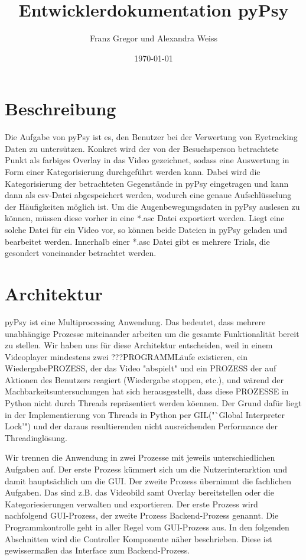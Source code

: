\documentclass[a4paper,draft]{scrartcl}
\title{Entwicklerdokumentation pyPsy}
\author{Franz Gregor und Alexandra Weiss}
\date{\today}
\begin{document}
\maketitle
\newpage
\tableofcontents
\newpage
\section{Beschreibung}
Die Aufgabe von pyPsy ist es, den Benutzer bei der Verwertung von Eyetracking Daten zu untersützen. Konkret wird der von der Besuchsperson betrachtete Punkt als farbiges Overlay in das Video gezeichnet, sodass eine Auswertung in Form einer Kategorisierung durchgeführt werden kann. Dabei wird die Kategorisierung der betrachteten Gegenstände in pyPsy eingetragen und kann dann als csv-Datei abgespeichert werden, wodurch eine genaue Aufschlüsselung der Häufigkeiten möglich ist. 
Um die Augenbewegungsdaten in pyPsy auslesen zu können, müssen diese vorher in eine *.asc Datei exportiert werden. Liegt eine solche Datei für ein Video vor, so können beide Dateien in pyPsy geladen und bearbeitet werden.
Innerhalb einer *.asc Datei gibt es mehrere Trials, die gesondert voneinander betrachtet werden.

\section{Architektur}
pyPsy ist eine Multiprocessing Anwendung.
Das bedeutet, dass mehrere unabh\"angige Prozesse miteinander arbeiten um die gesamte Funktionalit\"at bereit zu stellen.
Wir haben uns f\"ur diese Architektur entscheiden, weil in einem Videoplayer mindestens zwei ???PROGRAMML\"aufe existieren, ein WiedergabePROZESS, der das Video "abspielt" und ein PROZESS der auf Aktionen des Benutzers reagiert (Wiedergabe stoppen, etc.), und w\"arend der Machbarkeitsuntersuchungen hat sich herausgestellt, dass diese PROZESSE in Python nicht durch Threads repr\"asentiert werden k\"oennen.
Der Grund daf\"ur liegt in der Implementierung von Threads in Python per GIL("`Global Interpreter Lock'") und der daraus resultierenden nicht ausreichenden Performance der Threadingl\"osung.

Wir trennen die Anwendung in zwei Prozesse mit jeweils unterschiedlichen Aufgaben auf.
Der erste Prozess k\"ummert sich um die Nutzerinterarktion und damit haupts\"achlich um die GUI.
Der zweite Prozess \"ubernimmt die fachlichen Aufgaben. Das sind z.B. das Videobild samt Overlay bereitstellen oder die Kategoriesierungen verwalten und exportieren.
Der erste Prozess wird nachfolgend GUI-Prozess, der zweite Prozess Backend-Prozess genannt.
Die Programmkontrolle geht in aller Regel vom GUI-Prozess aus.
In den folgenden Abschnitten wird die Controller Komponente n\"aher beschrieben.
Diese ist gewisserma\ss en das Interface zum Backend-Prozess.
\end{document}
